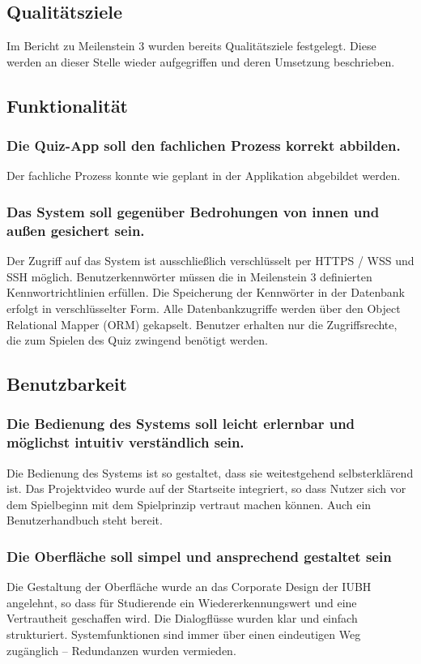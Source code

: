 \documentclass[a4paper,11pt,listof=numbered,glossary=totoc,parskip=half,toc=bib]{scrreprt}
\begin{document}
\begin{appendices}
		
	
	\chapter{Qualitätsziele}
	\label{chap:qziele}
	
	Im Bericht zu Meilenstein 3 wurden bereits Qualitätsziele festgelegt. Diese werden an dieser Stelle wieder aufgegriffen und deren Umsetzung beschrieben.
	
	\section{Funktionalität}
	
	\subsection{Die Quiz-App soll den fachlichen Prozess korrekt abbilden.}
	Der fachliche Prozess konnte wie geplant in der Applikation abgebildet werden.	
	
	\subsection{Das System soll gegenüber Bedrohungen von innen und außen gesichert sein.} 
	Der Zugriff auf das System ist ausschließlich verschlüsselt per HTTPS / WSS und SSH möglich. Benutzerkennwörter müssen die in Meilenstein 3 definierten Kennwortrichtlinien erfüllen. Die Speicherung der Kennwörter in der Datenbank erfolgt in verschlüsselter Form. Alle Datenbankzugriffe werden über den Object Relational Mapper (ORM) gekapselt. Benutzer erhalten nur die Zugriffsrechte, die zum Spielen des Quiz zwingend benötigt werden.
	
	\section{Benutzbarkeit}
	\subsection{Die Bedienung des Systems soll leicht erlernbar und möglichst intuitiv verständlich sein.}
	Die Bedienung des Systems ist so gestaltet, dass sie weitestgehend selbsterklärend ist. Das Projektvideo wurde auf der Startseite integriert, so dass Nutzer sich vor dem Spielbeginn mit dem Spielprinzip vertraut machen können. Auch ein Benutzerhandbuch steht bereit.
	\subsection{Die Oberfläche soll simpel und ansprechend gestaltet sein}
		Die Gestaltung der Oberfläche wurde an das Corporate Design der IUBH angelehnt, so dass für Studierende ein Wiedererkennungswert und eine Vertrautheit geschaffen wird. Die Dialogflüsse wurden klar und einfach strukturiert. Systemfunktionen sind immer über einen eindeutigen Weg zugänglich -- Redundanzen wurden vermieden.
		

\end{appendices}
\end{document}
